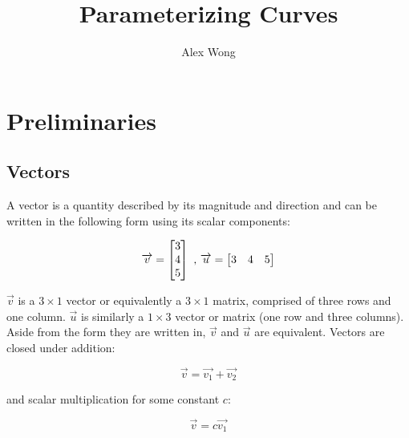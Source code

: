 \documentclass[12pt,letterpaper]{article}
\title{Parameterizing Curves}
\author{Alex Wong} %
\date{} %
\begin{document}
\maketitle

\section{Preliminaries}
\subsection{Vectors}

A vector is a quantity described by its magnitude and direction and can be written in the following form using its scalar components:

\begin{equation}
\label{eqn:vector-example}
    \overrightarrow{v} = \begin{bmatrix} 3 \\ 4 \\ 5 \end{bmatrix} \\
    \text{ , } \\
    \overrightarrow{u} = \begin{bmatrix} 3 & 4 & 5 \end{bmatrix}
\end{equation}

$\overrightarrow{v}$ is a $3 \times 1$ vector or equivalently a $3 \times 1$ matrix, comprised of three rows and one column. $\overrightarrow{u}$ is similarly a $1 \times 3$ vector or matrix (one row and three columns). Aside from the form they are written in, $\overrightarrow{v}$ and $\overrightarrow{u}$ are equivalent.
Vectors are closed under addition:

\begin{equation}
    \overrightarrow{v} = \overrightarrow{v_{1}} + \overrightarrow{v_{2}} 
\end{equation}

and scalar multiplication for some constant $c$:

\begin{equation}
    \overrightarrow{v} = c\overrightarrow{v_{1}} 
\end{equation}
\end{document}
